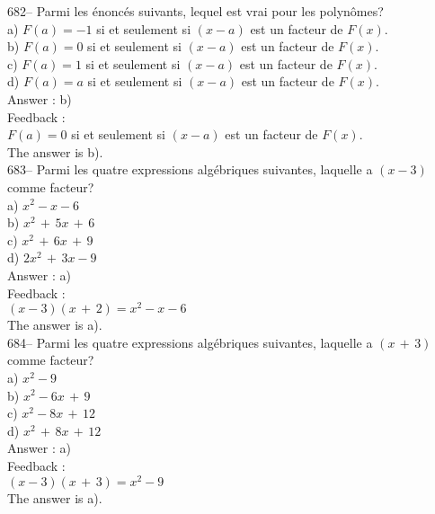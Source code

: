 \documentclass[letterpaper, 12pt]{article}
\begin{document}
682-- Parmi les \'enonc\'es suivants, lequel est vrai pour les polyn\^omes?\\
a)  $F\left( a\right) = -1$ si et seulement si $\left( x-a\right) $
est un
facteur de $F\left( x\right) $.\\
b) $ F\left( a\right) = 0 $ si et seulement si $ \left( x-a\right) $
est un facteur
de $F\left( x\right) $.\\
c) $ F\left( a\right) = 1 $ si et seulement si $ \left( x-a\right) $
est un facteur
de $F\left( x\right) $.\\
d) $ F\left( a\right) = a $ si et seulement si $ \left( x-a\right) $
est un facteur
de $F\left( x\right) $.\\

Answer : b)\\

Feedback : \\
$ F\left( a\right) = 0 $ si et seulement si $ \left( x-a\right) $
est un facteur de
$F\left( x\right) $.\\
The answer is b).\\

683-- Parmi les quatre expressions alg\'ebriques suivantes, laquelle a
$\left( x-3\right)$ comme facteur?\\
a) $x^{2}-x-6$\\
b) $x^{2}\,+\,5x\,+\,6$\\
c) $x^{2}\,+\,6x\,+\,9$\\
d) $2x^{2}\,+\,3x-9$\\

Answer : a)\\

Feedback : \\
$(x-3)(x\,+\,2)=x^{2}-x-6$\\
The answer is a).\\

684-- Parmi les quatre expressions alg\'ebriques suivantes, laquelle a
$\left( x\,+\,3\right) $ comme facteur?\\
a) $x^{2}-9$\\
b) $x^{2}-6x\,+\,9$\\
c) $x^{2}-8x\,+\,12$\\
d) $x^{2}\,+\,8x\,+\,12$\\

Answer : a)\\

Feedback : \\
$\left( x-3\right) \left( x\,+\,3\right) = x^{2}-9$\\
The answer is a).\\
\end{document}
